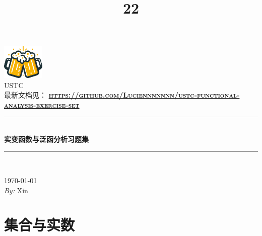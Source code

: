 \documentclass{article}
\title{22}
\newcommand{\HRule}{\rule{\linewidth}{0.5mm}}
\begin{document}
\begin{titlepage}

\begin{center}


\includegraphics[width=0.15\textwidth]{figures/Clinking Beer Mugs.pdf}\\[1cm]    

\textsc{\LARGE USTC}\\[1.5cm]

\textsc{\Large 最新文档见： \textbf{\url{https://github.com/Luciennnnnnn/ustc-functional-analysis-exercise-set}}}\\[0.5cm]


\HRule \\[0.4cm]
{ \huge \bfseries 实变函数与泛函分析习题集}\\[0.4cm]

\HRule \\[1.5cm]

%

\vfill

{\large \today \\ \emph{By:} Xin}

\end{center}

\end{titlepage}





\section{集合与实数}
\end{document}

